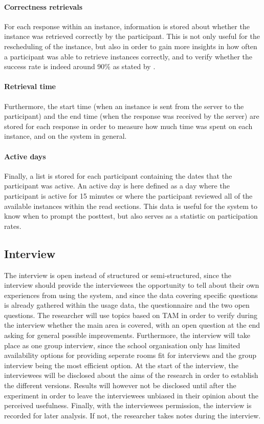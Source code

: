 \paragraph{Correctness retrievals} For each response within an instance, information is stored about whether the instance was retrieved correctly by the participant. This is not only useful for the rescheduling of the instance, but also in order to gain more insights in how often a participant was able to retrieve instances correctly, and to verify whether the success rate is indeed around 90\% as stated by .

\paragraph{Retrieval time} Furthermore, the start time (when an instance is sent from the server to the participant) and the end time (when the response was received by the server) are stored for each response in order to measure how much time was spent on each instance, and on the system in general.

\paragraph{Active days} Finally, a list is stored for each participant containing the dates that the participant was active. An active day is here defined as a day where the participant is active for 15 minutes or where the participant reviewed all of the available instances within the read sections. This data is useful for the system to know when to prompt the posttest, but also serves as a statistic on participation rates.

\subsection{Interview}

The interview is open instead of structured or semi-structured, since the interview should provide the interviewees the opportunity to tell about their own experiences from using the system, and since the data covering specific questions is already gathered within the usage data, the questionnaire and the two open questions. The researcher will use topics based on TAM in order to verify during the interview whether the main area is covered, with an open question at the end asking for general possible improvements. Furthermore, the interview will take place as one group interview, since the school organisation only has limited availability options for providing seperate rooms fit for interviews and the group interview being the most efficient option. At the start of the interview, the interviewees will be disclosed about the aims of the research in order to establish the different versions. Results will however not be disclosed until after the experiment in order to leave the interviewees unbiased in their opinion about the perceived usefulness. Finally, with the interviewees permission, the interview is recorded for later analysis. If not, the researcher takes notes during the interview.

